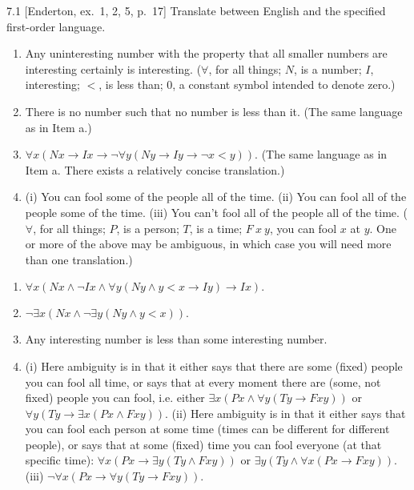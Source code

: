
\begin{exercise}{7.1}
  [Enderton, ex.~1, 2, 5, p.~17]
  Translate between English and the specified first-order language.
  \begin{enumerate}[label=(\alph*)]
    \item Any uninteresting number with the property that all smaller numbers are interesting certainly is interesting. ($\forall$, for all things; $N$, is a number; $I$, interesting; $<$, is less than; $0$, a constant symbol intended to denote zero.)
    \item There is no number such that no number is less than it. (The same language as in Item a.)
    \item $\forall x(Nx\rightarrow Ix\rightarrow\neg\forall y(Ny\rightarrow Iy\rightarrow\neg x<y))$. (The same language as in Item a. There exists a relatively concise translation.)
    \item (i) You can fool some of the people all of the time. (ii) You can fool all of the people some of the time. (iii) You can't fool all of the people all of the time. ($\forall$, for all things; $P$, is a person; $T$, is a time; $F\ x\ y$, you can fool $x$ at $y$. One or more of the above may be ambiguous, in which case you will need more than one translation.)\qedhere
  \end{enumerate}
\end{exercise}

\begin{enumerate}[label=(\alph*)]
  \item $\forall x(Nx\wedge\neg Ix\wedge\forall y (Ny\wedge y<x\rightarrow Iy)\rightarrow Ix).$
  \item $\neg\exists x(Nx\wedge\neg\exists y(Ny\wedge y<x)).$
  \item Any interesting number is less than some interesting number.
  \item (i) Here ambiguity is in that it either says that there are some (fixed) people you can fool all time, or says that at every moment there are (some, not fixed) people you can fool, i.e. either $\exists x(Px\wedge\forall y(Ty\to Fxy))$ or $\forall y(Ty\to\exists x(Px\wedge Fxy))$. (ii) Here ambiguity is in that it either says that you can fool each person at some time (times can be different for different people), or says that at some (fixed) time you can fool everyone (at that specific time): $\forall x(Px\to\exists y(Ty\wedge Fxy))$ or $\exists y(Ty\wedge\forall x(Px\to Fxy))$. (iii) $\neg\forall x(Px\to\forall y(Ty\to Fxy)).$
\end{enumerate}

